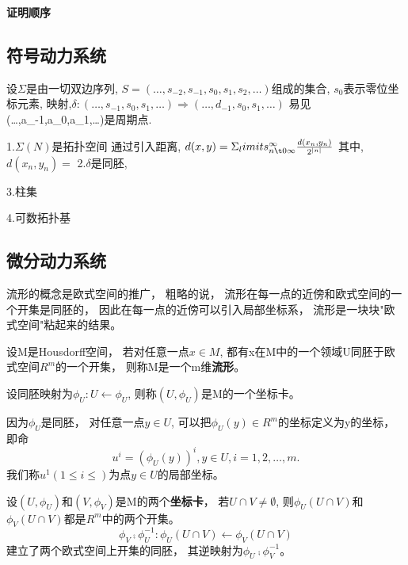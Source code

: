 \begin{center}
  \textbf{证明顺序}
\end{center}


\begin{center}
\end{center}

\subsection{符号动力系统}
设\(\Sigma\)是由一切双边序列,
\(S=(\dots,s_{-2},s_{-1},s_{0},s_1,s_2,\dots)\)组成的集合,
\(s_0\)表示零位坐标元素,
映射,\(\delta:(\dots,s_{-1},s_0,s_1,\dots)\Rightarrow (\dots,d_{-1},s_0,s_1,\dots)\)
易见(\dots,a_{-1},a_0,a_1,\dots)是周期点.

1.\(\Sigma(N)\)是拓扑空间
通过引入距离,
\(d(x,y)=\Sigma_limits_{n\t0\infty}^{\infty}\frac{d(x_n,y_n)}{2^{|n|}}\)
其中,
\(d(x_n,y_n)=\)
2.\(\delta\)是同胚,

3.柱集

4.可数拓扑基


\subsection{微分动力系统}

流形的概念是欧式空间的推广，
粗略的说，
流形在每一点的近傍和欧式空间的一个开集是同胚的，
因此在每一点的近傍可以引入局部坐标系，
流形是一块块"欧式空间"粘起来的结果。

\begin{Defination}
设M是Housdorff空间，
若对任意一点\(x\in M\),
都有x在M中的一个领域U同胚于欧式空间\(R^m\)的一个开集，
则称M是一个m维\textbf{流形}。
\end{Defination}

设同胚映射为\(\phi_{U}:U\leftarrow \phi_{U}\),
则称\((U,\phi_{U})\)是M的一个坐标卡。

因为\(\phi_{U}\)是同胚，
对任意一点\(y \in U\),
可以把\(\phi_{U}(y)\in R^{m}\)的坐标定义为y的坐标，
即命
\[u^i=(\phi_U(y))^i,y\in U,i=1,2,\dots,m.\]
我们称\(u^1(1\leq i \leq)\)为点\(y \in U\)的局部坐标。

设\((U,\phi_U)\)和\((V,\phi_V)\)是M的两个\textbf{坐标卡}，
若\(U\cap V \neq \emptyset \),
则\(\phi_U(U\cap V)\)和\(\phi_V(U\cap V)\)都是\(R^m\)中的两个开集。
\[\phi_V \comp \phi_U^{-1}:\phi_U(U\cap V) \leftarrow \phi_V(U\cap V)\]
建立了两个欧式空间上开集的同胚，
其逆映射为\(\phi_U \comp \phi_V^{-1}\)。


